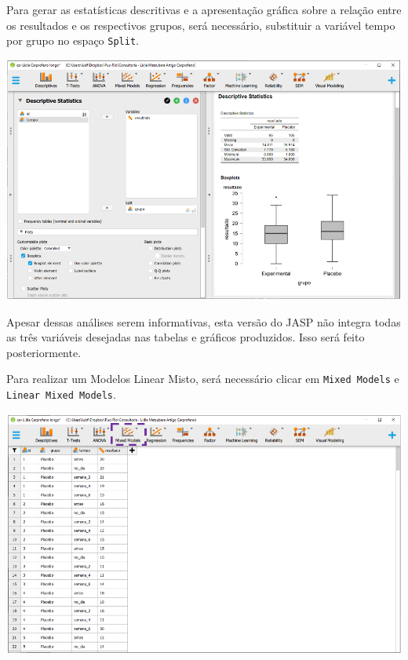 \documentclass[
]{book}
\begin{document}
Para gerar as estatísticas descritivas e a apresentação gráfica sobre a relação entre os resultados e os respectivos grupos, será necessário, substituir a variável tempo por grupo no espaço \texttt{Split}.

\includegraphics{./img/cap_lmm_boxplots2.png}

Apesar dessas análises serem informativas, esta versão do JASP não integra todas as três variáveis desejadas nas tabelas e gráficos produzidos. Isso será feito posteriormente.

Para realizar um Modelos Linear Misto, será necessário clicar em \texttt{Mixed\ Models} e \texttt{Linear\ Mixed\ Models}.

\includegraphics{./img/cap_lmm_interface.png}
\end{document}
